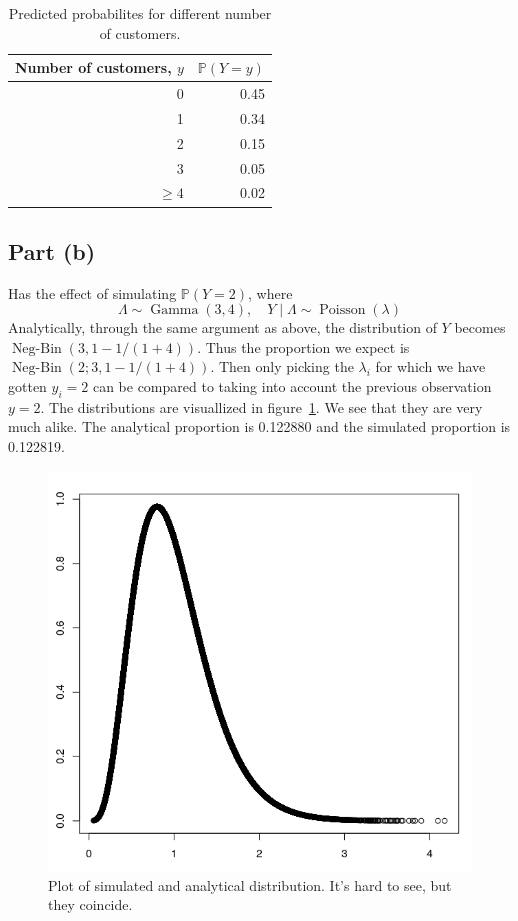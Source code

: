 \documentclass{article}
\DeclareMathOperator\Poisson{Poisson}
\DeclareMathOperator\GammaDist{Gamma}
\DeclareMathOperator\NegBin{Neg-Bin}
\begin{document}
\begin{table}
	\caption{Predicted probabilites for different number of customers. \label{tab:anal_pred_prob}}
	\centering
	\begin{tabular}{r r}
		\toprule
		\multicolumn{1}{c}{\bfseries Number of customers, $y$} & \multicolumn{1}{c}{$\mathbb P(Y = y)$} \\
		\midrule
		0 & 0.45 \\
		1 & 0.34 \\
		2 & 0.15 \\
		3 & 0.05 \\
		$\ge 4$ & 0.02 \\
		\bottomrule
	\end{tabular}
\end{table}
\afterpage{\clearpage}

\subsection{Part (b)}
Has the effect of simulating $\mathbb P(Y = 2)$,
where
$$ \Lambda \sim \GammaDist(3, 4), \quad Y \mid \Lambda \sim \Poisson(\lambda) $$
Analytically, through the same argument as above,
the distribution of $Y$ becomes $\NegBin(3, 1 - 1/(1+4))$.
Thus the proportion we expect is $\NegBin(2; 3, 1 - 1/(1+4))$.
Then only picking the $\lambda_i$ for which we have gotten $y_i = 2$
can be compared to taking into account the previous observation $y = 2$.
The distributions are visuallized in figure~\ref{fig:bplot}.
We see that they are very much alike.
The analytical proportion is 0.122880 and the simulated proportion is 0.122819.

\begin{figure}
	\centering
	\includegraphics[width=\textwidth]{bplot.png}
	\caption{Plot of simulated and analytical distribution. It's hard to see, but they coincide. \label{fig:bplot}}
\end{figure}
\afterpage{\clearpage}
\end{document}
